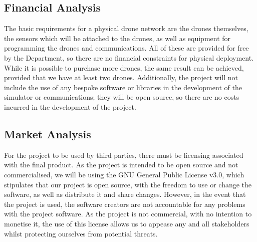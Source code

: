 \documentclass[12pt,a4paper,twoside]{report}
\begin{document}
		\subsection{Financial Analysis}
		The basic requirements for a physical drone network are the drones themselves, the sensors which will be attached to the drones, as well as equipment for programming the drones and communications. All of these are provided for free by the Department, so there are no financial constraints for physical deployment. While it is possible to purchase more drones, the same result can be achieved, provided that we have at least two drones. Additionally, the project will not include the use of any bespoke software or libraries in the development of the simulator or communications; they will be open source, so there are no costs incurred in the development of the project.
		\subsection{Market Analysis}
		For the project to be used by third parties, there must be licensing associated with the final product. As the project is intended to be open source and not commercialised, we will be using the GNU General Public License v3.0, which stipulates that our project is open source, with the freedom to use or change the software, as well as distribute it and share changes. However, in the event that the project is used, the software creators are not accountable for any problems with the project software. As the project is not commercial, with no intention to monetise it, the use of this license allows us to appease any and all stakeholders whilst protecting ourselves from potential threats.
\end{document}
